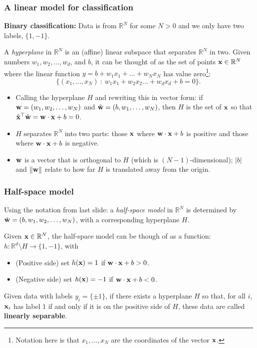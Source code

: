\documentclass{beamer}
\theoremstyle{example}
\begin{document}
\begin{frame}
    \frametitle{A linear model for classification}
    \textbf{Binary classification:} Data is from $\mathbb R^N$ for some $N>0$ and we only have two labels, $\{1, -1\}$. %
        
        A \emph{hyperplane} in $\mathbb R^N$ is an (affine) linear subspace that separates $\mathbb R^N$ in two. %
        Given numbers $w_1,w_2,\ldots,w_d$, and $b$, it can be thought of as the set of points ${\bf x}\in\mathbb R^N$ where the linear function $y=b+w_1x_1+\ldots + w_Nx_N$ has value zero\footnote{Notation here is that $x_1,\ldots,x_N$ are the coordinates of the vector ${\bf x}$.}: 
            \[\{(x_1,\ldots,x_N)\ :\ w_1x_1 + w_2x_2\ldots + w_dx_d + b = 0\}.\]

    \begin{itemize}
        \item Calling the hyperplane $H$ and rewriting this in vector form: if ${\bf w}=(w_1,w_2,\ldots,w_N)$ and $\tilde{\bf w} = (b,w_1,\ldots,w_N)$, then $H$ is the set of ${\bf x}$ so that $\tilde{\bf x}^\top\tilde{\bf w} = {\bf w}\cdot{\bf x} + b = 0$.
        \pause
        \item $H$ separates $\mathbb R^N$ into two parts: those ${\bf x}$ where ${\bf w}\cdot{\bf x} + b$ is positive and those where ${\bf w}\cdot{\bf x} + b$ is negative.
        \pause
        \item ${\bf w}$ is a vector that is orthogonal to $H$ (which is $(N-1)$-dimensional); $|b|$ and $\lVert{\bf w}\rVert$ relate to how far $H$ is translated away from the origin.
    \end{itemize}
    \vfill

\end{frame}

\begin{frame}
\frametitle{Half-space model}
    Using the notation from last slide:  a \emph{half-space model} in $\mathbb R^N$ is determined by $\tilde{\bf w} = (b,w_1,w_2,\ldots,w_N)$, with a corresponding hyperplane $H$.
    
    \pause
    Given ${\bf x}\in \mathbb R^N$, the half-space model can be though of as a function: $h:\mathbb R^d\setminus H \to \{1,-1\}$, with 
    \pause
    \begin{itemize}
        \item (Positive side) set $h({\bf x}) = 1$ if ${\bf w}\cdot{\bf x}+b > 0$.
        \item (Negative side) set $h({\bf x}) = -1$ if ${\bf w}\cdot{\bf x}+b < 0$. 
    \end{itemize}

    \pause
    Given data with labels $y_i = \{\pm1\}$, if there exists a hyperplane $H$ so that, for all $i$, ${\bf x}_i$ has label $1$ if and only if it is on the positive side of $H$, these data are called \textbf{linearly separable}. 

\end{frame}
\end{document}
